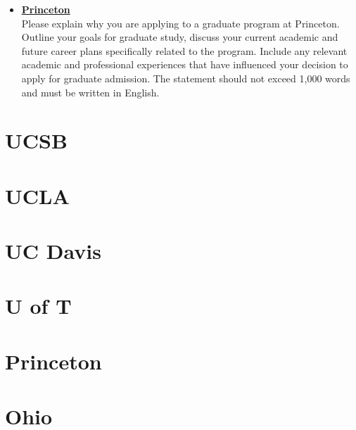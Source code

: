 \documentclass[12font]{article}
\numberwithin{equation}{section}    %
\begin{document}
{\begin{itemize}
        (one- to two-page free-form letter). The Letter of Intent is an opportunity for the applicant to write about any activities or experience that may be relevant to their graduate studies and to discuss areas of research interest. Applicants are also encouraged to mention faculty members whose research interests them. If you have been a co-author on a published or submitted a research manuscript, please give the full citation and/or arXiv link. If you have any experience working in a laboratory, please describe the work at least briefly, even if experimental work is not in your future plans. (Note that you can also upload application materials, such as transcripts, your CV, and your Letter of Intent, after submitting your application.)
    \item \textbf{\underline{Princeton}}    \\
        Please explain why you are applying to a graduate program at Princeton. Outline your goals for graduate study, discuss your current academic and future career plans specifically related to the program. Include any relevant academic and professional experiences that have influenced your decision to apply for graduate admission. The statement should not exceed 1,000 words and must be written in English.
\end{itemize}
}

\section*{UCSB}
\begin{multicols}{2}
    
\end{multicols}

\section*{UCLA}

\section*{UC Davis}

\section*{U of T}
\begin{multicols}{2}
    
\end{multicols}

\section*{Princeton}

\section*{Ohio}
\begin{multicols}{0}
    
\end{multicols}
\end{document}
